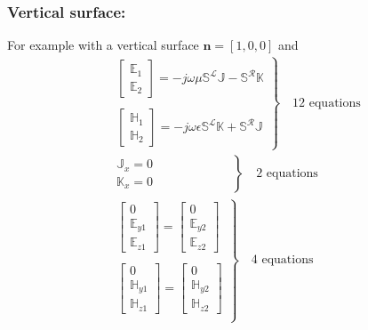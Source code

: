 \documentclass{article}
\newcommand{\n}{\mathbf{n}}
\renewcommand{\L}{\mathbf{\mathcal{L}}}
\newcommand{\R}{\mathbf{\mathcal{R}}}
\newcommand{\0}{\varnothing}
\newcommand{\Ev}{\mathbb{E}}
\newcommand{\Jv}{\mathbb{J}}
\newcommand{\Hv}{\mathbb{H}}
\newcommand{\Kv}{\mathbb{K}}
\newcommand{\SLm}{\mathbb{S}^\L}
\newcommand{\SRm}{\mathbb{S}^\R}
\begin{document}
\subsubsection*{Vertical surface:}
For example with a vertical surface $\n = [1,0,0]$ and  
\begin{align*}
&\left.
    \begin{array}{c}
    \left[\begin{array}{c}\Ev_1\\\Ev_2\end{array}\right]
    = -j\omega\mu \SLm \Jv - \SRm \Kv\\\\
    \left[\begin{array}{c}\Hv_1\\\Hv_2\end{array}\right]
     = -j\omega\epsilon \SLm \Kv + \SRm \Jv
    \end{array}\right\} \quad \text{12 equations}\\
     &\left.
    \begin{array}{c}
    \Jv_x  = 0 \\
    \Kv_x = 0 
    \end{array}\quad \quad \quad \quad \quad \quad \right\} \quad \text{2 equations}\\
    &\left.
    \begin{array}{c}
    \left[\begin{array}{c}0\\\Ev_{y1}\\\Ev_{z1}\end{array}\right] = 
    \left[\begin{array}{c}0\\\Ev_{y2}\\\Ev_{z2}\end{array}\right] \\\\
    \left[\begin{array}{c}0\\\Hv_{y1}\\\Hv_{z1}\end{array}\right] = 
    \left[\begin{array}{c}0\\\Hv_{y2}\\\Hv_{z2}\end{array}\right] \\
    \end{array}\right\} \quad \text{4 equations}\\
    &\left.
    \begin{array}{c}

\end{array}
\end{align*}
\end{document}
